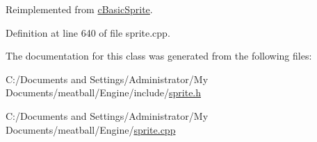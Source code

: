 Reimplemented from \hyperlink{classc_basic_sprite_a6f01984a6af849dc95cc9ec1f3528074}{c\-Basic\-Sprite}.



Definition at line 640 of file sprite.\-cpp.



The documentation for this class was generated from the following files\-:\begin{DoxyCompactItemize}
\item 
C\-:/\-Documents and Settings/\-Administrator/\-My Documents/meatball/\-Engine/include/\hyperlink{sprite_8h}{sprite.\-h}\item 
C\-:/\-Documents and Settings/\-Administrator/\-My Documents/meatball/\-Engine/\hyperlink{sprite_8cpp}{sprite.\-cpp}\end{DoxyCompactItemize}
